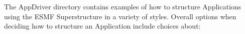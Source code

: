 %


The AppDriver directory contains examples of how to structure 
Applications using the ESMF Superstructure in a variety of styles.
Overall options when deciding how to structure an Application include
choices about:

